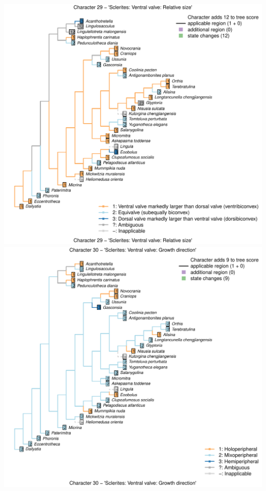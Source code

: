 \documentclass[]{book}
\theoremstyle{definition}
\theoremstyle{definition}
\theoremstyle{definition}
\theoremstyle{remark}
\begin{document}
\includegraphics{Brachiopod_phylogeny_files/figure-latex/unnamed-chunk-4-29.pdf}
\includegraphics{Brachiopod_phylogeny_files/figure-latex/unnamed-chunk-4-30.pdf}
\end{document}

